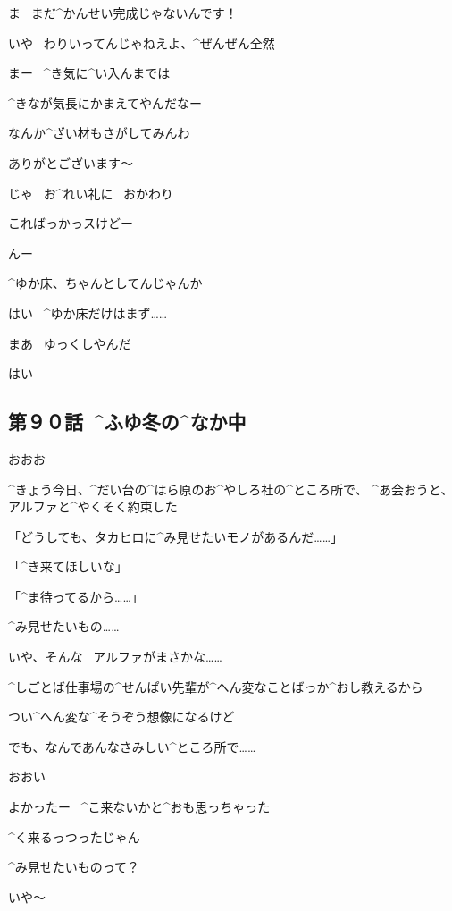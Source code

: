 \Alpha ま
\ まだ^{かんせい}{完成}じゃないんです！

\Ojisan いや
\ わりいってんじゃねえよ、^{ぜんぜん}{全然}

\Ojisan まー
\ ^{き}{気}に^{い}{入}んまでは

\Ojisan ^{きなが}{気長}にかまえてやんだなー

\Ojisan なんか^{ざい}{材}もさがしてみんわ

\Alpha ありがとございます〜

\page
\Alpha じゃ
\ お^{れい}{礼}に
\ おかわり

\Alpha こればっかっスけどー

\Ojisan んー

\page
\Ojisan ^{ゆか}{床}、ちゃんとしてんじゃんか

\Alpha はい
\ ^{ゆか}{床}だけはまず……

\page
\Ojisan まあ
\ ゆっくしやんだ

\Alpha はい


\subsection{第９０話\ ^{ふゆ}{冬}の^{なか}{中}}

\page[19]
\Alpha おおお

\page
\Takahiro ^{きょう}{今日}、^{だい}{台}の^{はら}{原}のお^{やしろ}{社}の^{ところ}{所}で、
^{あ}{会}おうと、アルファと^{やくそく}{約束}した

\Alpha 「どうしても、タカヒロに^{み}{見}せたいモノがあるんだ……」

\Alpha 「^{き}{来}てほしいな」

\Alpha 「^{ま}{待}ってるから……」

\Takahiro ^{み}{見}せたいもの……

\page
\Takahiro いや、そんな
\ アルファがまさかな……

\Takahiro ^{しごとば}{仕事場}の^{せんぱい}{先輩}が^{へん}{変}なことばっか^{おし}{教}えるから

\Takahiro つい^{へん}{変}な^{そうぞう}{想像}になるけど

\Takahiro でも、なんであんなさみしい^{ところ}{所}で……

\page[23]
\Alpha おおい

\Alpha よかったー
\ ^{こ}{来}ないかと^{おも}{思}っちゃった

\Takahiro ^{く}{来}るっつったじゃん

\page
\Takahiro ^{み}{見}せたいものって？

\Alpha いや〜

